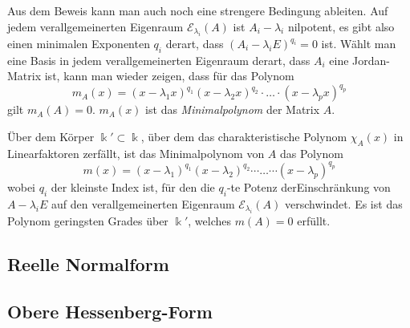Aus dem Beweis kann man auch noch eine strengere Bedingung ableiten.
Auf jedem verallgemeinerten Eigenraum $\mathcal{E}_{\lambda_i}(A)$
ist $A_i-\lambda_i$ nilpotent, es gibt also einen minimalen Exponenten
$q_i$ derart, dass $(A_i-\lambda_iE)^{q_i}=0$ ist.
Wählt man eine Basis in jedem verallgemeinerten Eigenraum derart,
dass $A_i$ eine Jordan-Matrix ist, kann man wieder zeigen, dass
für das Polynom
\[
m_A(x)
=
(x-\lambda_1x)^{q_1}
(x-\lambda_2x)^{q_2}
\cdot
\ldots
\cdot
(x-\lambda_px)^{q_p}
\]
gilt $m_A(A)=0$.
$m_A(x)$ ist das {\em Minimalpolynom} der Matrix $A$.
%

\begin{satz}[Minimalpolynom]
Über dem Körper $\Bbbk'\subset\Bbbk$, über dem das charakteristische
Polynom $\chi_A(x)$ in Linearfaktoren zerfällt, ist das Minimalpolynom
von $A$ das Polynom
\[
m(x)
=
(x-\lambda_1)^{q_1}
(x-\lambda_2)^{q_2}
\cdots
\ldots
\cdots
(x-\lambda_p)^{q_p}
\]
wobei $q_i$ der kleinste Index ist, für den die $q_i$-te Potenz
derEinschränkung von $A-\lambda_i E$ auf den verallgemeinerten Eigenraum
$\mathcal{E}_{\lambda_i}(A)$ verschwindet.
Es ist das Polynom geringsten Grades über $\Bbbk'$, welches $m(A)=0$ erfüllt.
\end{satz}


\subsection{Reelle Normalform
\label{buch:subsection:reelle-normalform}}

\subsection{Obere Hessenberg-Form
\label{buch:subsection:obere-hessenberg-form}}



